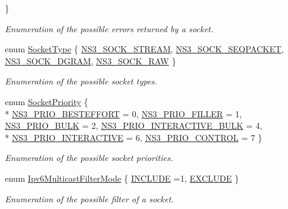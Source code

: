 \begin{DoxyCompactItemize}
 \}\begin{DoxyCompactList}\small\item\em Enumeration of the possible errors returned by a socket. \end{DoxyCompactList}
\item 
enum \hyperlink{classns3_1_1Socket_a698fbcc486a48b7a0d2b0e4ab863d571}{Socket\+Type} \{ \hyperlink{classns3_1_1Socket_a698fbcc486a48b7a0d2b0e4ab863d571a322b0c0b6e6b3911049276b46f2c55ca}{N\+S3\+\_\+\+S\+O\+C\+K\+\_\+\+S\+T\+R\+E\+AM}, 
\hyperlink{classns3_1_1Socket_a698fbcc486a48b7a0d2b0e4ab863d571a714dd4d09fa13a3f9cf90a3525efa6d4}{N\+S3\+\_\+\+S\+O\+C\+K\+\_\+\+S\+E\+Q\+P\+A\+C\+K\+ET}, 
\hyperlink{classns3_1_1Socket_a698fbcc486a48b7a0d2b0e4ab863d571a635a1582f4396f31f7bc2e78c105f3fb}{N\+S3\+\_\+\+S\+O\+C\+K\+\_\+\+D\+G\+R\+AM}, 
\hyperlink{classns3_1_1Socket_a698fbcc486a48b7a0d2b0e4ab863d571aa97c397d36e85f30278a64ef94d40e03}{N\+S3\+\_\+\+S\+O\+C\+K\+\_\+\+R\+AW}
 \}\begin{DoxyCompactList}\small\item\em Enumeration of the possible socket types. \end{DoxyCompactList}
\item 
enum \hyperlink{classns3_1_1Socket_a9b12adffe479408a899f1ad9b5cfbb1b}{Socket\+Priority} \{ \\*
\hyperlink{classns3_1_1Socket_a9b12adffe479408a899f1ad9b5cfbb1ba1786dc9cad2f4cbf61f26e63ff8f1993}{N\+S3\+\_\+\+P\+R\+I\+O\+\_\+\+B\+E\+S\+T\+E\+F\+F\+O\+RT} = 0, 
\hyperlink{classns3_1_1Socket_a9b12adffe479408a899f1ad9b5cfbb1baa4e5c089ee6b64fc345ca5bf58b9e6c9}{N\+S3\+\_\+\+P\+R\+I\+O\+\_\+\+F\+I\+L\+L\+ER} = 1, 
\hyperlink{classns3_1_1Socket_a9b12adffe479408a899f1ad9b5cfbb1ba0c05c3b71dddd8a77f9aabb3c54c581f}{N\+S3\+\_\+\+P\+R\+I\+O\+\_\+\+B\+U\+LK} = 2, 
\hyperlink{classns3_1_1Socket_a9b12adffe479408a899f1ad9b5cfbb1babe40af18f4db874a2b65e559045ffa9b}{N\+S3\+\_\+\+P\+R\+I\+O\+\_\+\+I\+N\+T\+E\+R\+A\+C\+T\+I\+V\+E\+\_\+\+B\+U\+LK} = 4, 
\\*
\hyperlink{classns3_1_1Socket_a9b12adffe479408a899f1ad9b5cfbb1ba3a7e3bd56aa4fd29a973ce3a22e35ff8}{N\+S3\+\_\+\+P\+R\+I\+O\+\_\+\+I\+N\+T\+E\+R\+A\+C\+T\+I\+VE} = 6, 
\hyperlink{classns3_1_1Socket_a9b12adffe479408a899f1ad9b5cfbb1bab4ecda07872ca1e7dfb5734f7c38feae}{N\+S3\+\_\+\+P\+R\+I\+O\+\_\+\+C\+O\+N\+T\+R\+OL} = 7
 \}\begin{DoxyCompactList}\small\item\em Enumeration of the possible socket priorities. \end{DoxyCompactList}
\item 
enum \hyperlink{classns3_1_1Socket_a96f39fe2b73d5691b319093a1e31615d}{Ipv6\+Multicast\+Filter\+Mode} \{ \hyperlink{classns3_1_1Socket_a96f39fe2b73d5691b319093a1e31615da3518a166d4dda6c74bf8aaaade9edf7a}{I\+N\+C\+L\+U\+DE} =1, 
\hyperlink{classns3_1_1Socket_a96f39fe2b73d5691b319093a1e31615da622cd948d674aa5f4d1e9062dc1f5d75}{E\+X\+C\+L\+U\+DE}
 \}\begin{DoxyCompactList}\small\item\em Enumeration of the possible filter of a socket. \end{DoxyCompactList}
\end{DoxyCompactItemize}
